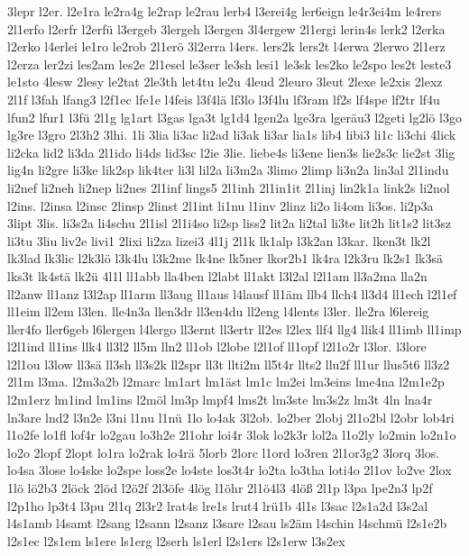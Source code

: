 {3lepr
l2er.
l2e1ra
le2ra4g
le2rap
le2rau
lerb4
l3erei4g
ler6eign
le4r3ei4m
le4rers
2l1erfo
l2erfr
l2erfü
l3ergeb
3lergeh
l3ergen
3l4ergew
2l1ergi
lerin4s
lerk2
l2erka
l2erko
l4erlei
le1ro
le2rob
2l1erö
3l2erra
l4ers.
lers2k
lers2t
l4erwa
2lerwo
2l1erz
l2erza
ler2zi
les2am
les2e
2l1esel
le3ser
le3sh
lesi1
le3sk
les2ko
le2spo
les2t
leste3
le1sto
4lesw
2lesy
le2tat
2le3th
let4tu
le2u
4leud
2leuro
3leut
2lexe
le2xis
2lexz
2l1f
l3fah
lfang3
l2f1ec
lfe1e
l4feis
l3f4lä
lf3lo
l3f4lu
lf3ram
lf2s
lf4spe
lf2tr
lf4u
lfun2
lfur1
l3fü
2l1g
lg1art
l3gas
lga3t
lg1d4
lgen2a
lge3ra
lgeräu3
l2geti
lg2lö
l3go
lg3re
l3gro
2l3h2
3lhi.
1li
3lia
li3ac
li2ad
li3ak
li3ar
lia1s
lib4
libi3
li1c
li3chi
4lick
li2cka
lid2
li3da
2l1ido
li4ds
lid3sc
l2ie
3lie.
liebe4s
li3ene
lien3s
lie2s3c
lie2st
3lig
lig4n
li2gre
li3ke
lik2sp
lik4ter
li3l
lil2a
li3m2a
3limo
2limp
li3n2a
lin3al
2l1indu
li2nef
li2neh
li2nep
li2nes
2l1inf
lings5
2l1inh
2l1in1it
2l1inj
lin2k1a
link2s
li2nol
l2ins.
l2insa
l2insc
2linsp
2linst
2l1int
li1nu
l1inv
2linz
li2o
li4om
li3os.
li2p3a
3lipt
3lis.
li3s2a
li4schu
2l1isl
2l1i4so
li2sp
liss2
lit2a
li2tal
li3te
lit2h
lit1s2
lit3sz
li3tu
3liu
liv2e
livi1
2lixi
li2za
lizei3
4l1j
2l1k
lk1alp
l3k2an
l3kar.
lken3t
lk2l
lk3lad
lk3lic
l2k3lö
l3k4lu
l3k2me
lk4ne
lk5ner
lkor2b1
lk4ra
l2k3ru
lk2s1
lk3sä
lks3t
lk4stä
lk2ü
4l1l
ll1abb
lla4ben
l2labt
ll1akt
l3l2al
l2l1am
ll3a2ma
lla2n
ll2anw
ll1anz
l3l2ap
ll1arm
ll3aug
ll1aus
l4lausf
ll1äm
llb4
llch4
ll3d4
ll1ech
l2l1ef
ll1eim
ll2em
l3len.
lle4n3a
llen3dr
ll3en4du
ll2eng
l4lents
l3ler.
lle2ra
l6lereig
ller4fo
ller6geb
l6lergen
l4lergo
ll3ernt
ll3ertr
ll2es
l2lex
llf4
llg4
llik4
ll1imb
ll1imp
l2l1ind
ll1ins
llk4
ll3l2
ll5m
lln2
ll1ob
l2lobe
l2l1of
ll1opf
l2l1o2r
l3lor.
l3lore
l2l1ou
l3low
ll3sä
ll3sh
ll3s2k
ll2spr
ll3t
llti2m
ll5t4r
llts2
llu2f
ll1ur
llus5t6
ll3z2
2l1m
l3ma.
l2m3a2b
l2marc
lm1art
lm1äst
lm1c
lm2ei
lm3eins
lme4na
l2m1e2p
l2m1erz
lm1ind
lm1ins
l2möl
lm3p
lmpf4
lms2t
lm3ste
lm3s2z
lm3t
4ln
lna4r
ln3are
lnd2
l3n2e
l3ni
l1nu
l1nü
1lo
lo4ak
3l2ob.
lo2ber
2lobj
2l1o2bl
l2obr
lob4ri
l1o2fe
lo1fl
lof4r
lo2gau
lo3h2e
2l1ohr
loi4r
3lok
lo2k3r
lol2a
l1o2ly
lo2min
lo2n1o
lo2o
2lopf
2lopt
lo1ra
lo2rak
lo4rä
5lorb
2lorc
l1ord
lo3ren
2l1or3g2
3lorq
3los.
lo4sa
3lose
lo4ske
lo2spe
loss2e
lo4ste
los3t4r
lo2ta
lo3tha
loti4o
2l1ov
lo2ve
2lox
1lö
lö2b3
2löck
2löd
l2ö2f
2l3öfe
4lög
l1öhr
2l1ö4l3
4löß
2l1p
l3pa
lpe2n3
lp2f
l2p1ho
lp3t4
l3pu
2l1q
2l3r2
lrat4s
lre1s
lrut4
lrü1b
4l1s
l3sac
l2s1a2d
l3s2al
l4s1amb
l4samt
l2sang
l2sann
l2sanz
l3sare
l2sau
ls2äm
l4schin
l4schmü
l2s1e2b
l2s1ec
l2s1em
ls1ere
ls1erg
l2serh
ls1erl
l2s1ers
l2s1erw
l3s2ex
}
